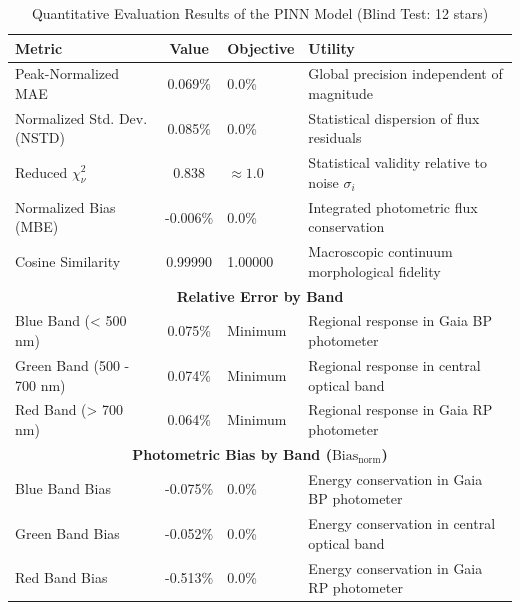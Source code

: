 
\begin{table}[htpb]
\centering
\caption{Quantitative Evaluation Results of the PINN Model (Blind Test: 12 stars)}
\label{tab:pinn_evaluation}
\begin{tabular}{lcll}
\hline
\textbf{Metric} & \textbf{Value} & \textbf{Objective} & \textbf{Utility} \\
\hline
Peak-Normalized MAE & 0.069\% & 0.0\% & Global precision independent of magnitude \\
Normalized Std. Dev. (NSTD) & 0.085\% & 0.0\% & Statistical dispersion of flux residuals \\
Reduced $\chi^2_\nu$ & 0.838 & $\approx 1.0$ & Statistical validity relative to noise $\sigma_i$ \\
Normalized Bias (MBE) & -0.006\% & 0.0\% & Integrated photometric flux conservation \\
Cosine Similarity & 0.99990 & 1.00000 & Macroscopic continuum morphological fidelity \\
\hline
\multicolumn{4}{c}{\textbf{Relative Error by Band}} \\
\hline
Blue Band (< 500 nm) & 0.075\% & Minimum & Regional response in Gaia BP photometer \\
Green Band (500 - 700 nm) & 0.074\% & Minimum & Regional response in central optical band \\
Red Band (> 700 nm) & 0.064\% & Minimum & Regional response in Gaia RP photometer \\
\hline
\multicolumn{4}{c}{\textbf{Photometric Bias by Band ($\text{Bias}_{\text{norm}}$)}} \\
\hline
Blue Band Bias & -0.075\% & 0.0\% & Energy conservation in Gaia BP photometer \\
Green Band Bias & -0.052\% & 0.0\% & Energy conservation in central optical band \\
Red Band Bias & -0.513\% & 0.0\% & Energy conservation in Gaia RP photometer \\
\hline
\end{tabular}
\end{table}
